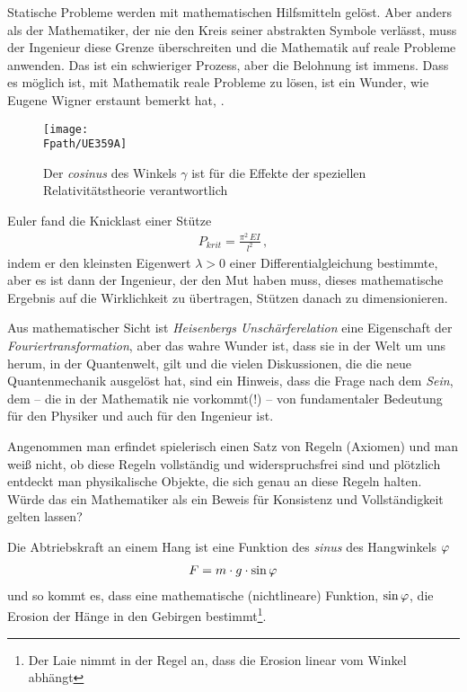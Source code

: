 Statische Probleme werden mit mathematischen Hilfsmitteln gel\"{o}st. Aber anders als der Mathematiker, der nie den Kreis seiner abstrakten Symbole verl\"{a}sst, muss der Ingenieur diese Grenze \"{u}berschreiten und die Mathematik auf reale Probleme anwenden. Das ist ein schwieriger Prozess, aber die Belohnung ist immens. Dass es m\"{o}glich ist, mit Mathematik reale Probleme zu l\"{o}sen, ist ein Wunder, wie Eugene Wigner erstaunt bemerkt hat, \cite{Wigner}.
\begin{figure}[tbp]
\centering
\if {} \sidecaption \fi
\texttt{[image: \\Fpath/UE359A]}
\caption{Der {\em cosinus\/} des Winkels $\gamma$ ist f\"{u}r die Effekte der speziellen Relativit\"{a}tstheorie verantwortlich} \label{UE359}
\end{figure}%

Euler fand die Knicklast einer St\"{u}tze
\begin{align}
P_{krit} = \frac{\pi^2\,EI}{l^2}\,,
\end{align}
indem er den kleinsten Eigenwert $\lambda > 0$ einer Differentialgleichung bestimmte, aber es ist dann der Ingenieur, der den Mut haben muss, dieses mathematische Ergebnis auf die Wirklichkeit zu \"{u}bertragen, St\"{u}tzen danach zu dimensionieren.

Aus mathematischer Sicht ist {\em Heisenbergs Unsch\"{a}rferelation\/} eine Eigenschaft der {\em Fouriertransformation\/}, aber das wahre Wunder ist, dass sie in der Welt um uns herum, in der Quantenwelt, gilt und die vielen Diskussionen, die die neue Quantenmechanik ausgel\"{o}st hat, sind ein Hinweis, dass die Frage nach dem {\em Sein\/}, dem \grq{} -- die in der Mathematik nie vorkommt(!) -- von fundamentaler Bedeutung f\"{u}r den Physiker und auch f\"{u}r den Ingenieur ist.

Angenommen man erfindet spielerisch einen Satz von Regeln (Axiomen) und man wei{\ss} nicht, ob diese Regeln vollst\"{a}ndig und widerspruchsfrei sind und pl\"{o}tzlich entdeckt man physikalische Objekte, die sich genau an diese Regeln halten. W\"{u}rde das ein Mathematiker als ein Beweis f\"{u}r Konsistenz und Vollst\"{a}ndigkeit gelten lassen?

Die Abtriebskraft an einem Hang ist eine Funktion des {\em sinus\/} des Hangwinkels $\varphi$
\begin{align}
F = m \cdot g \cdot \sin \varphi
\end{align}
und so kommt es, dass eine mathematische (nichtlineare) Funktion, $\sin \varphi$, die Erosion der H\"{a}nge in den Gebirgen bestimmt\footnote{Der Laie nimmt in der Regel an, dass die Erosion linear vom Winkel abh\"{a}ngt}.

